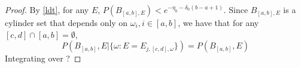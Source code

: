 \begin{proof}
By \eqref{ldt}, for any $E$, $P(B_{[a,b],E})<e^{-\eta_0-\delta_0(b-a+1)}$. Since $B_{[a,b],E}$ is a cylinder set that depends only on $\omega_i, i\in[a,b]$, we have that for any $[c,d]\cap[a,b]=\emptyset$,
\[
  P(B_[a,b],E|\{\omega: E=E_{j,[c,d],\omega}\})=P(B_[a,b],E)
\]
Integrating over  ?
\end{proof}
